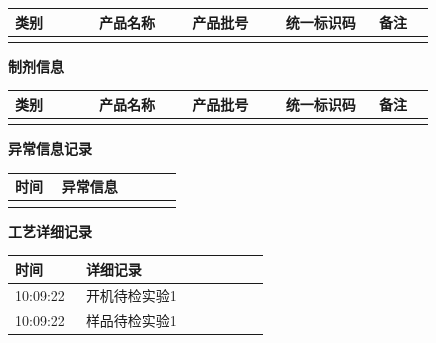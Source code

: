 \documentclass[UTF8,10pt,a4paper,fontset=fandol]{ctexart}
\newcommand{\fieldvalue}[1]{#1}
\begin{document}
\begin{minipage}[t]{0.47\linewidth}
\begin{tabular}{|p{0.18\linewidth}|p{0.20\linewidth}|p{0.20\linewidth}|p{0.20\linewidth}|p{0.12\linewidth}|}
\hline
类别 & 产品名称 & 产品批号 & 统一标识码 & 备注 \\ \hline
 & & & & \\ \hline
\end{tabular}

\vspace{2mm}
\textbf{制剂信息}

\begin{tabular}{|p{0.18\linewidth}|p{0.20\linewidth}|p{0.20\linewidth}|p{0.20\linewidth}|p{0.12\linewidth}|}
\hline
类别 & 产品名称 & 产品批号 & 统一标识码 & 备注 \\ \hline
 & & & & \\ \hline
\end{tabular}

\vspace{2mm}
\textbf{异常信息记录}

\begin{tabular}{|p{0.25\linewidth}|p{0.65\linewidth}|}
\hline
时间 & 异常信息 \\ \hline
 & \\ \hline
\end{tabular}

\vspace{2mm}
\textbf{工艺详细记录}

\begin{tabular}{|p{0.25\linewidth}|p{0.65\linewidth}|}
\hline
时间 & 详细记录 \\ \hline
\fieldvalue{10:09:22} &
\fieldvalue{开机待检实验1}
\\ \hline
\fieldvalue{10:09:22} &
\fieldvalue{样品待检实验1}
\\ \hline
\end{tabular}

\end{minipage}
\hfill
\end{document}
